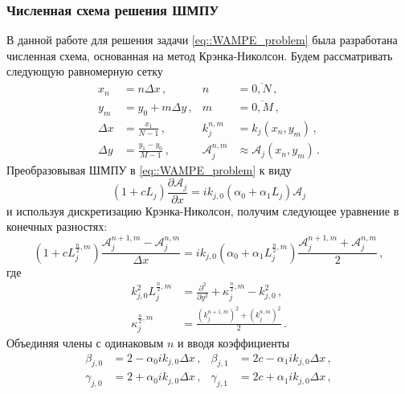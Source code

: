 \documentclass{fefu}
\newcommand{\pa}[1]{\left(#1\right)}
\begin{document}
            \subsubsection{\label{sec::numerical_scheme}Численная схема решения ШМПУ}
                \par В данной работе для решения задачи \eqref{eq::WAMPE_problem} была разработана численная схема, основанная на метод Крэнка-Николсон. Будем рассматривать следующую равномерную сетку
                \begin{equation}
                    \begin{aligned}
                        x_n&=n\Delta x\,,&n&=\overline{0,N}\,,\\
                        y_m&=y_0+m\Delta y\,,&m&=\overline{0,M}\,,\\
                        \Delta x&=\frac{x_1}{N-1}\,,&k_j^{n,m}&=k_j\pa{x_n,y_m}\,,\\
                        \Delta y&=\frac{y_1-y_0}{M-1}\,,&\mathcal{A}_j^{n,m}&\approx\mathcal{A}_j\pa{x_n,y_m}\,.
                    \end{aligned}
                \end{equation}
                Преобразовывая ШМПУ в \eqref{eq::WAMPE_problem} к виду
                \begin{equation}\label{eq::evolution_equation}
                    \pa{1+cL_j}\frac{\partial\mathcal{A}_j}{\partial x}=ik_{j,0}\pa{\alpha_0+\alpha_1L_j}\mathcal{A}_j
                \end{equation}
                и используя дискретизацию Крэнка-Николсон, получим следующее уравнение в конечных разностях:
                \begin{equation}
                    \pa{1+cL_j^{\frac{n}{2},m}}\frac{\mathcal{A}_j^{n+1,m}-\mathcal{A}_j^{n,m}}{\Delta x}=ik_{j,0}\pa{\alpha_0+\alpha_1L_j^{\frac{n}{2},m}}\frac{\mathcal{A}_j^{n+1,m}+\mathcal{A}_j^{n,m}}{2}\,,
                \end{equation}
                где 
                \begin{align*}
                    k_{j,0}^2L_j^{\frac{n}{2},m}&=\frac{\partial^2}{\partial y^2}+\kappa_j^{\frac{n}{2},m}-k_{j,0}^2\,,\\
                    \kappa_j^{\frac{n}{2},m}&=\frac{\pa{k_j^{n+1,m}}^2+\pa{k_j^{n,m}}^2}{2}\,.
                \end{align*}
                Объединяя члены с одинаковым $n$ и вводя коэффициенты
                \begin{align*}
                    \beta_{j,0}&=2-\alpha_0ik_{j,0}\Delta x\,,&\beta_{j,1}&=2c-\alpha_1ik_{j,0}\Delta x\,,\\
                    \gamma_{j,0}&=2+\alpha_0ik_{j,0}\Delta x\,,&\gamma_{j,1}&=2c+\alpha_1ik_{j,0}\Delta x\,,
                \end{align*}
\end{document}
